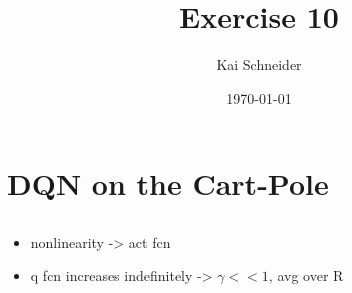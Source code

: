 \documentclass[11pt,a4paper]{article}
\title{Exercise 10}
\author{Kai Schneider}
\date{\today}
\begin{document}
 

\maketitle

\section{DQN on the Cart-Pole}

\subsection{}

\begin{itemize}
  \item nonlinearity -> act fcn
  \item q fcn increases indefinitely -> $\gamma << 1$, avg over R
\end{itemize}
\end{document}
